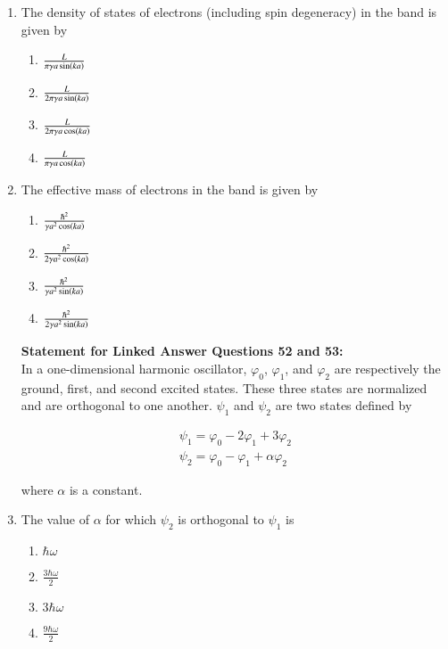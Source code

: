 \documentclass[journal]{IEEEtran}
\begin{document}
\begin{enumerate}
    \item The density of states of electrons (including spin degeneracy) in the band is given by
    \begin{multicols}{4}
        \begin{enumerate}
            \item $\frac{L}{\pi \gamma a \sin\left(ka\right)}$
            \item $\frac{L}{2\pi \gamma a \sin\left(ka\right)}$
            \item $\frac{L}{2\pi \gamma a \cos\left(ka\right)}$
            \item $\frac{L}{\pi \gamma a \cos\left(ka\right)}$
        \end{enumerate}
    \end{multicols}
    
    \item The effective mass of electrons in the band is given by
    \begin{multicols}{4}
        \begin{enumerate}
            \item $\frac{\hbar^2}{\gamma a^2 \cos\left(ka\right)}$
            \item $\frac{\hbar^2}{2\gamma a^2 \cos\left(ka\right)}$
            \item $\frac{\hbar^2}{\gamma a^2 \sin\left(ka\right)}$
            \item $\frac{\hbar^2}{2\gamma a^2 \sin\left(ka\right)}$
        \end{enumerate}
    \end{multicols}

    \textbf{Statement for Linked Answer Questions 52 and 53:} \\
    In a one-dimensional harmonic oscillator, $\varphi_0$, $\varphi_1$, and $\varphi_2$ are respectively the
    ground, first, and second excited states. These three states are normalized and are orthogonal to one another.
    $\psi_1$ and $\psi_2$ are two states defined by

    \begin{align*}
    \psi_1 = \varphi_0 - 2\varphi_1 + 3\varphi_2 \\
    \psi_2 = \varphi_0 - \varphi_1 + \alpha\varphi_2
    \end{align*}

    where $\alpha$ is a constant.

    \item The value of $\alpha$ for which $\psi_2$ is orthogonal to $\psi_1$ is

    \begin{multicols}{4}
        \begin{enumerate}
            \item $\hbar\omega$
            \item $\frac{3\hbar\omega}{2}$
            \item $3\hbar\omega$
            \item $\frac{9\hbar\omega}{2}$
        \end{enumerate}
    \end{multicols}
\end{enumerate}
\end{document}
